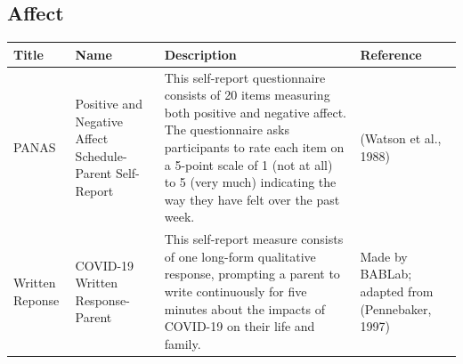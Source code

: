 \documentclass[]{book}
\begin{document}
\hypertarget{affect}{%
\subsection{Affect}\label{affect}}

\begin{longtable}[]{@{}llll@{}}
\toprule
\begin{minipage}[b]{0.22\columnwidth}\raggedright
Title\strut
\end{minipage} & \begin{minipage}[b]{0.27\columnwidth}\raggedright
Name\strut
\end{minipage} & \begin{minipage}[b]{0.22\columnwidth}\raggedright
Description\strut
\end{minipage} & \begin{minipage}[b]{0.18\columnwidth}\raggedright
Reference\strut
\end{minipage}\tabularnewline
\midrule
\endhead
\begin{minipage}[t]{0.22\columnwidth}\raggedright
PANAS\strut
\end{minipage} & \begin{minipage}[t]{0.27\columnwidth}\raggedright
Positive and Negative Affect Schedule- Parent Self-Report\strut
\end{minipage} & \begin{minipage}[t]{0.22\columnwidth}\raggedright
This self-report questionnaire consists of 20 items measuring both positive and negative affect. The questionnaire asks participants to rate each item on a 5-point scale of 1 (not at all) to 5 (very much) indicating the way they have felt over the past week.\strut
\end{minipage} & \begin{minipage}[t]{0.18\columnwidth}\raggedright
(Watson et al., 1988)\strut
\end{minipage}\tabularnewline
\begin{minipage}[t]{0.22\columnwidth}\raggedright
Written Reponse\strut
\end{minipage} & \begin{minipage}[t]{0.27\columnwidth}\raggedright
COVID-19 Written Response- Parent\strut
\end{minipage} & \begin{minipage}[t]{0.22\columnwidth}\raggedright
This self-report measure consists of one long-form qualitative response, prompting a parent to write continuously for five minutes about the impacts of COVID-19 on their life and family.\strut
\end{minipage} & \begin{minipage}[t]{0.18\columnwidth}\raggedright
Made by BABLab; adapted from (Pennebaker, 1997)\strut
\end{minipage}\tabularnewline
\bottomrule
\end{longtable}
\end{document}
